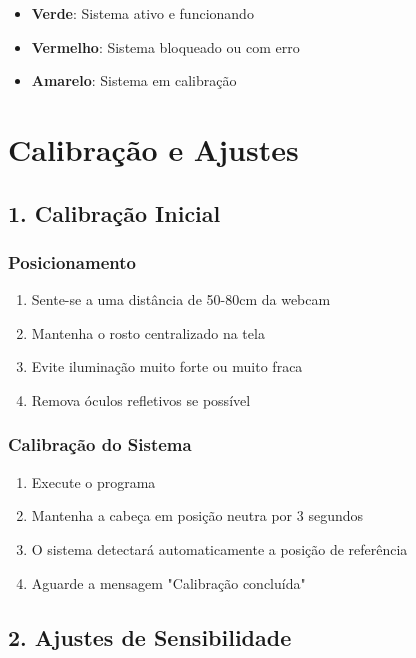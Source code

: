 \documentclass[12pt,a4paper]{article}
\begin{document}
\begin{itemize}
    \item \textbf{Verde}: Sistema ativo e funcionando
    \item \textbf{Vermelho}: Sistema bloqueado ou com erro
    \item \textbf{Amarelo}: Sistema em calibração
\end{itemize}

\section{Calibração e Ajustes}

\subsection{1. Calibração Inicial}

\subsubsection{Posicionamento}

\begin{enumerate}
    \item Sente-se a uma distância de 50-80cm da webcam
    \item Mantenha o rosto centralizado na tela
    \item Evite iluminação muito forte ou muito fraca
    \item Remova óculos refletivos se possível
\end{enumerate}

\subsubsection{Calibração do Sistema}

\begin{enumerate}
    \item Execute o programa
    \item Mantenha a cabeça em posição neutra por 3 segundos
    \item O sistema detectará automaticamente a posição de referência
    \item Aguarde a mensagem "Calibração concluída"
\end{enumerate}

\subsection{2. Ajustes de Sensibilidade}
\end{document}
